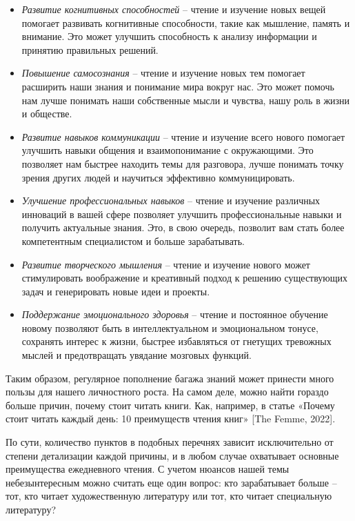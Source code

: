 \begin{itemize}[noitemsep, label=--]
    \item \textit{Развитие когнитивных способностей} – чтение и изучение новых вещей помогает развивать когнитивные способности, такие как мышление, память и внимание. Это может улучшить способность к анализу информации и принятию правильных решений.
    \item \textit{Повышение самосознания} – чтение и изучение новых тем помогает расширить наши знания и понимание мира вокруг нас. Это может помочь нам лучше понимать наши собственные мысли и чувства, нашу роль в жизни и обществе.
    \item \textit{Развитие навыков коммуникации} – чтение и изучение всего нового помогает улучшить навыки общения и взаимопонимание с окружающими. Это позволяет нам быстрее находить темы для разговора, лучше понимать точку зрения других людей и научиться эффективно коммуницировать.
    \item \textit{Улучшение профессиональных навыков} – чтение и изучение различных инноваций в вашей сфере позволяет улучшить профессиональные навыки и получить актуальные знания. Это, в свою очередь, позволит вам стать более компетентным специалистом и больше зарабатывать.
    \item \textit{Развитие творческого мышления} – чтение и изучение нового может стимулировать воображение и креативный подход к решению существующих задач и генерировать новые идеи и проекты.
    \item \textit{Поддержание эмоционального здоровья} – чтение и постоянное обучение новому позволяют быть в интеллектуальном и эмоциональном тонусе, сохранять интерес к жизни, быстрее избавляться от гнетущих тревожных мыслей и предотвращать увядание мозговых функций.
\end{itemize}

Таким образом, регулярное пополнение багажа знаний может принести много пользы для нашего личностного роста. На самом деле, можно найти гораздо больше причин, почему стоит читать книги. Как, например, в статье «Почему стоит читать каждый день: 10 преимуществ чтения книг» [The Femme, 2022].

По сути, количество пунктов в подобных перечнях зависит исключительно от степени детализации каждой причины, и в любом случае охватывает основные преимущества ежедневного чтения. С учетом нюансов нашей темы небезынтересным можно считать еще один вопрос: кто зарабатывает больше – тот, кто читает художественную литературу или тот, кто читает специальную литературу?

